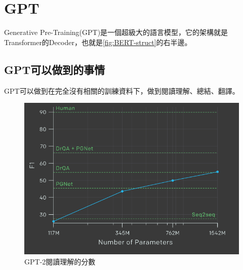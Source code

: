 \section{GPT}
Generative Pre-Training(GPT)是一個超級大的語言模型，它的架構就是Transformer的Decoder，也就是\autoref{fig:BERT-struct}的右半邊。
\subsection{GPT可以做到的事情}
GPT可以做到在完全沒有相關的訓練資料下，做到閱讀理解、總結、翻譯。
\begin{figure}[htbp!]
    \centering
    \includegraphics[width=0.5\linewidth]{images/w6/GPT2-reading.png}
    \caption{GPT-2閱讀理解的分數}
    \label{fig:GPT2-reading}
\end{figure}